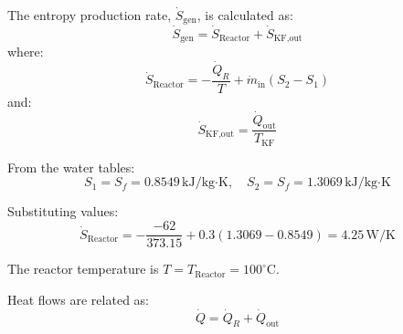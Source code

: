 The entropy production rate, \( \dot{S}_{\text{gen}} \), is calculated as:  
\[
\dot{S}_{\text{gen}} = \dot{S}_{\text{Reactor}} + \dot{S}_{\text{KF,out}}
\]  
where:  
\[
\dot{S}_{\text{Reactor}} = -\frac{\dot{Q}_R}{T} + \dot{m}_{\text{in}} (S_2 - S_1)
\]  
and:  
\[
\dot{S}_{\text{KF,out}} = \frac{\dot{Q}_{\text{out}}}{T_{\text{KF}}}
\]  

From the water tables:  
\[
S_1 = S_f = 0.8549 \, \text{kJ/kg·K}, \quad S_2 = S_f = 1.3069 \, \text{kJ/kg·K}
\]  

Substituting values:  
\[
\dot{S}_{\text{Reactor}} = -\frac{-62}{373.15} + 0.3 (1.3069 - 0.8549) = 4.25 \, \text{W/K}
\]  

The reactor temperature is \( T = T_{\text{Reactor}} = 100^\circ\text{C} \).  

Heat flows are related as:  
\[
\dot{Q} = \dot{Q}_R + \dot{Q}_{\text{out}}
\]